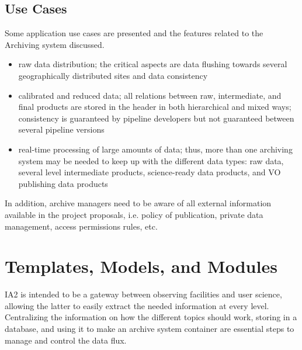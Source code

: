 \subsection{Use Cases}
Some application use cases are presented and the features related to the Archiving system discussed.
\begin{itemize}
  \item raw data distribution; the critical aspects are data flushing towards several geographically distributed sites and data consistency
  \item calibrated and reduced data; all relations between raw, intermediate, and final products are stored in the header in both hierarchical and mixed ways; consistency is guaranteed by pipeline developers but not guaranteed between several pipeline versions
  \item real-time processing of large amounts of data; thus, more than one archiving system may be needed to keep up with the different data types: raw data, several level intermediate products, science-ready data products, and VO publishing data products
\end{itemize}
In addition, archive managers need to be aware of all external information available in the project proposals, i.e. policy of publication, private data management, access permissions rules, etc. 

\section{Templates, Models, and Modules}
IA2 is intended to be a gateway between observing facilities and user science, allowing the latter to easily extract the needed information at every level. Centralizing the information on how the different topics should work, storing in a database, and using it to make an archive system container are essential steps to manage and control the data flux.

